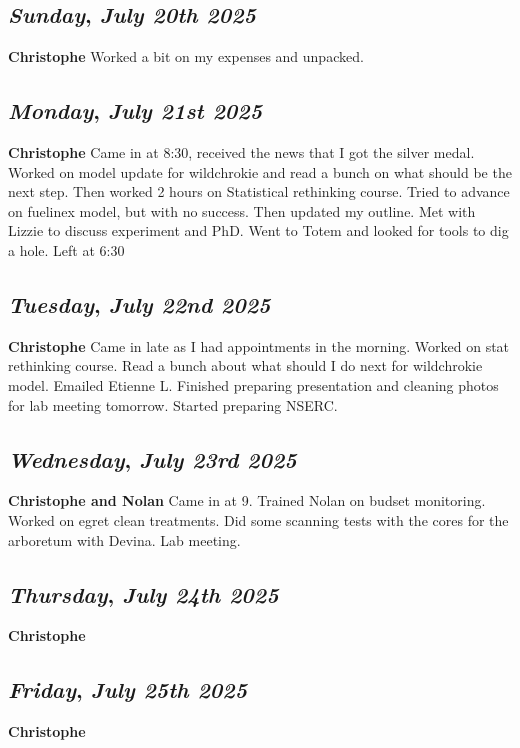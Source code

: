 \def\day{\textit{July 20th 2025}}
\def\weekday{\textit{Sunday}}
\subsection*{\weekday, \day}
\textbf {Christophe}
Worked a bit on my expenses and unpacked. 

\def\day{\textit{July 21st 2025}}
\def\weekday{\textit{Monday}}
\subsection*{\weekday, \day}
\textbf {Christophe}
Came in at 8:30, received the news that I got the silver medal. Worked on model update for wildchrokie and read a bunch on what should be the next step. Then worked 2 hours on Statistical rethinking course. Tried to advance on fuelinex model, but with no success. Then updated my outline. Met with Lizzie to discuss experiment and PhD. Went to Totem and looked for tools to dig a hole. Left at 6:30

\def\day{\textit{July 22nd 2025}}
\def\weekday{\textit{Tuesday}}
\subsection*{\weekday, \day}
\textbf {Christophe}
Came in late as I had appointments in the morning. Worked on stat rethinking course. Read a bunch	about what should I do next for wildchrokie model. Emailed Etienne L. Finished preparing presentation and cleaning photos for lab meeting tomorrow. Started preparing NSERC. 

\def\day{\textit{July 23rd 2025}}
\def\weekday{\textit{Wednesday}}
\subsection*{\weekday, \day}
\textbf {Christophe and Nolan}
Came in at 9. Trained Nolan on budset monitoring. Worked on egret clean treatments. Did some scanning tests with the cores for the arboretum with Devina. Lab meeting.

\def\day{\textit{July 24th 2025}}
\def\weekday{\textit{Thursday}}
\subsection*{\weekday, \day}
\textbf {Christophe}

\def\day{\textit{July 25th 2025}}
\def\weekday{\textit{Friday}}
\subsection*{\weekday, \day}
\textbf {Christophe}

